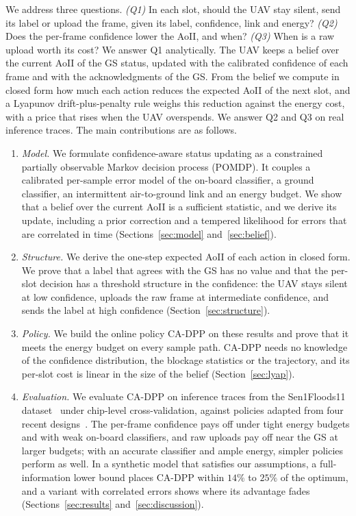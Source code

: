 \documentclass[5p,twocolumn]{elsarticle}
\theoremstyle{remark}
\begin{document}
We address three questions. \emph{(Q1)} In each slot, should the UAV stay silent, send its label or upload the frame, given its label, confidence, link and energy? \emph{(Q2)} Does the per-frame confidence lower the AoII, and when? \emph{(Q3)} When is a raw upload worth its cost? We answer Q1 analytically. The UAV keeps a belief over the current AoII of the GS status, updated with the calibrated confidence of each frame and with the acknowledgments of the GS. From the belief we compute in closed form how much each action reduces the expected AoII of the next slot, and a Lyapunov drift-plus-penalty rule weighs this reduction against the energy cost, with a price that rises when the UAV overspends. We answer Q2 and Q3 on real inference traces. The main contributions are as follows.
\begin{enumerate}
\item \emph{Model.} We formulate confidence-aware status updating as a constrained partially observable Markov decision process (POMDP). It couples a calibrated per-sample error model of the on-board classifier, a ground classifier, an intermittent air-to-ground link and an energy budget. We show that a belief over the current AoII is a sufficient statistic, and we derive its update, including a prior correction and a tempered likelihood for errors that are correlated in time (Sections~\ref{sec:model} and~\ref{sec:belief}).
\item \emph{Structure.} We derive the one-step expected AoII of each action in closed form. We prove that a label that agrees with the GS has no value and that the per-slot decision has a threshold structure in the confidence: the UAV stays silent at low confidence, uploads the raw frame at intermediate confidence, and sends the label at high confidence (Section~\ref{sec:structure}).
\item \emph{Policy.} We build the online policy CA-DPP on these results and prove that it meets the energy budget on every sample path. CA-DPP needs no knowledge of the confidence distribution, the blockage statistics or the trajectory, and its per-slot cost is linear in the size of the belief (Section~\ref{sec:lyap}).
\item \emph{Evaluation.} We evaluate CA-DPP on inference traces from the Sen1Floods11 dataset~\cite{bonafilia2020sen1floods11} under chip-level cross-validation, against policies adapted from four recent designs~\cite{zakeri2023aoiieh,gan2025taoi,pehlivanoglu2026orbit,basnayaka2025aomi}. The per-frame confidence pays off under tight energy budgets and with weak on-board classifiers, and raw uploads pay off near the GS at larger budgets; with an accurate classifier and ample energy, simpler policies perform as well. In a synthetic model that satisfies our assumptions, a full-information lower bound places CA-DPP within $14\%$ to $25\%$ of the optimum, and a variant with correlated errors shows where its advantage fades (Sections~\ref{sec:results} and~\ref{sec:discussion}).
\end{enumerate}
\end{document}

